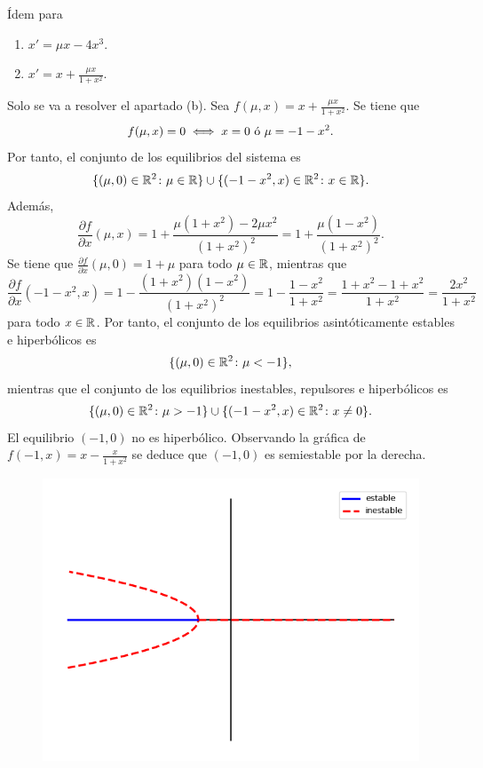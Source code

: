 \documentclass[11pt]{report}
\begin{document}
\begin{exercise}
    Ídem para
    \begin{enumerate}
        \item $x' = \mu x - 4x^3$.
        \item $x' = x+\frac{\mu x}{1+x^2}$.
    \end{enumerate}
\end{exercise}

\begin{solution}
    Solo se va a resolver el apartado (b). Sea $f(\mu,x) = x+\frac{\mu x}{1+x^2}$. Se tiene que
    \begin{align*}
        f(\mu,x) = 0 \iff x = 0 \textup{ ó } \mu = -1-x^2.
    \end{align*}
    Por tanto, el conjunto de los equilibrios del sistema es
    \[\{(\mu,0) \in\mathbb R^2 \colon \mu \in \mathbb R\} \cup \{(-1-x^2,x) \in\mathbb R^2 \colon x \in \mathbb R\}.\]
    Además, \[\frac{\partial f}{\partial x}(\mu,x) = 1+\frac{\mu(1+x^2)-2\mu x^2}{(1+x^2)^2} = 1+\frac{\mu(1 -x^2)}{(1+x^2)^2}.\] Se tiene que $\frac{\partial f}{\partial x}(\mu,0) = 1+\mu$ para todo $\mu\in\mathbb R$, mientras que \[\frac{\partial f}{\partial x}(-1-x^2,x) = 1-\frac{(1+x^2)(1-x^2)}{(1+x^2)^2} = 1-\frac{1-x^2}{1+x^2} = \frac{1+x^2-1+x^2}{1+x^2} = \frac{2x^2}{1+x^2}\] para todo $x\in\mathbb R$. Por tanto, el conjunto de los equilibrios asintóticamente estables e hiperbólicos es
    \[\{(\mu,0) \in\mathbb R^2 \colon \mu < -1\},\]
    mientras que el conjunto de los equilibrios inestables, repulsores e hiperbólicos es
    \[\{(\mu,0) \in\mathbb R^2 \colon \mu > -1\} \cup \{(-1-x^2,x) \in\mathbb R^2 \colon x \neq 0\}.\]
    El equilibrio $(-1,0)$ no es hiperbólico. Observando la gráfica de $f(-1,x) = x-\frac{x}{1+x^2}$ se deduce que $(-1,0)$ es semiestable por la derecha.
    \begin{figure}[H]
        \centering
        \includegraphics[scale=0.5]{img/10.png}
    \end{figure}
\end{solution}
\end{document}
